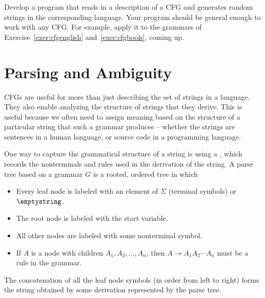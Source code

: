 \documentclass[twoside,letterpaper,openany]{book}
\begin{document}
\begin{progexer}\happymac
Develop a program that reads in a description of a CFG and generates random strings in the corresponding language. Your program should be general enough to work with any CFG. For example, apply it to the grammars of Exercise~\ref{exer:cfgenglish} and~\ref{exer:cfgbools}, coming up.
\end{progexer}




\clearpage

\section{Parsing and Ambiguity}

\begin{discussion}
CFGs are useful for more than just describing the set of strings in a language. They also enable analyzing the structure of strings that they derive. This is useful because we often need to assign meaning based on the structure of a particular string that such a grammar produces -- whether the strings are sentences in a human language, or source code in a programming language.
\end{discussion}

\begin{defn}
One way to capture the grammatical structure of a string is using a , which records the nonterminals and rules used in the derivation of the string. A parse tree based on a grammar $G$ is a rooted, ordered tree in which
\begin{itemize}
\item Every leaf node is labeled with an element of $\Sigma$ (terminal symbols) or $\emptystring$.
\item The root node is labeled with the start variable.
\item All other nodes are labeled with some nonterminal symbol.
\item If $A$ is a node with children $A_1, A_2, \ldots, A_n$, then $A \to A_1 A_2 \cdots A_n$ must be a rule in the grammar.
\end{itemize}
The concatenation of all the leaf node symbols (in order from left to right) forms the string obtained by some derivation represented by the parse tree.
\end{defn}
\end{document}
